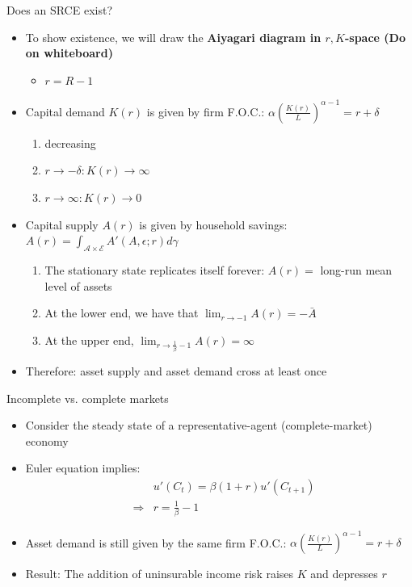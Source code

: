 \documentclass[9pt]{beamer}
\newcommand{\bit}{\begin{itemize}}
\newcommand{\eit}{\end{itemize}}
\newcommand{\ben}{\begin{enumerate}}
\newcommand{\een}{\end{enumerate}}
\newcommand{\bc}{\color{blue}}
\newcommand{\rc}{\color{red}}
\begin{document}
\begin{frame}{Does an SRCE exist?}

\bit
\setlength\itemsep{1.5em}

\item To show existence, we will draw the \bf Aiyagari diagram \normalfont in $r,K$-space {\rc (Do on whiteboard)} 
\bit
\item $r = R -1$
\eit

\item Capital demand $K(r)$ is given by firm F.O.C.: $\alpha \left(\frac{K(r)}{L}\right)^{\alpha-1} = r+\delta $
\ben
\setlength\itemsep{0.5em}
\item decreasing
\item $r \to -\delta: K(r) \to \infty$
\item $r \to \infty: K(r) \to  0$
\een

\item Capital supply $A(r)$ is given by household savings: $A(r) = \int_{\bm{\mathcal A} \times \bm{\mathcal E}} A'(A,\epsilon; r) d\gamma $
\ben
\setlength\itemsep{0.5em}
\item The stationary state replicates itself forever: $A(r) = $ long-run mean level of assets  
\item At the lower end, we have that $\lim_{r \to -1} A(r) = - \bar A$
\item {\bc At the upper end, $\lim_{r \to \frac{1}{\beta}-1} A(r) = \infty$}
\een

\item Therefore: {\bc asset supply and asset demand cross at least once}
\eit
	
\end{frame}



\begin{frame}{Incomplete vs. complete markets}

\bit
\setlength\itemsep{2em}

\item Consider the steady state of a representative-agent (complete-market) economy

\item Euler equation implies:
\begin{eqnarray}
&& u'(C_t) = \beta (1+r) u'(C_{t+1}) \nonumber \\
&\Rightarrow& r=\frac{1}{\beta}-1 \nonumber
\end{eqnarray}

\item Asset demand is still given by the same firm F.O.C.: $\alpha \left(\frac{K(r)}{L}\right)^{\alpha-1} = r+\delta $

\item Result: {\bc The addition of uninsurable income risk raises $K$ and depresses $r$}
\eit

\end{frame}
\end{document}
